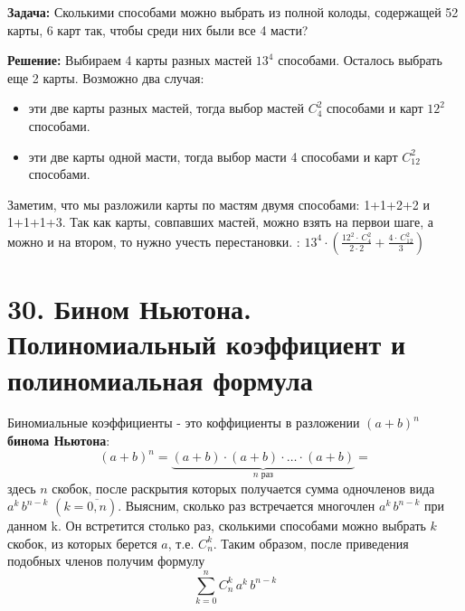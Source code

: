 \textbf{Задача:} Сколькими способами можно выбрать из полной колоды, содержащей 52 карты, 6 карт так, чтобы среди них были все 4 масти?
\par \textbf{Решение:} Выбираем 4 карты разных мастей $13^4$ способами. Осталось выбрать еще 2 карты. Возможно два случая:
\begin{itemize}
    \item эти две карты разных мастей, тогда выбор мастей ${C}_{4}^2$ способами и карт $12^2$ способами.
    \item эти две карты одной масти, тогда выбор масти 4 способами и карт ${C}_{12}^2$ способами.
\end{itemize}
Заметим, что мы разложили карты по мастям двумя способами: 1+1+2+2 и 1+1+1+3. Так как карты, совпавших мастей, можно взять на первои шаге, а можно и на втором, то нужно учесть перестановки. : $13^4\cdot(\frac{12^2\cdot \, {C}_4^2}{2\cdot 2}+\frac{4\cdot \, {C}_{12}^2}{3})$

\newpage
\section*{30. Бином Ньютона. Полиномиальный коэффициент и полиномиальная формула }

Биномиальные коэффициенты - это коффициенты в разложении $(a+b)^n$ \textbf{бинома Ньютона}:
$$(a+b)^n = \underbrace{(a+b)\cdot(a+b)\cdot\ldots\cdot(a+b)}_{n \text{ раз}}=$$
здесь $n$ скобок, после раскрытия которых получается сумма одночленов вида $a^k\, b^{n-k}$ \;\; $(k=\overline{0,n})$.
\newline Выясним, сколько раз встречается многочлен $a^k\, b^{n-k}$ при данном k. Он встретится столько раз, сколькими способами можно выбрать $k$ скобок, из которых берется $a$, т.е. ${C}_n^k$. Таким образом, после приведения подобных членов получим формулу
$$\sum_{k=0}^n{C}_n^k\,a^k\,b^{n-k}$$

